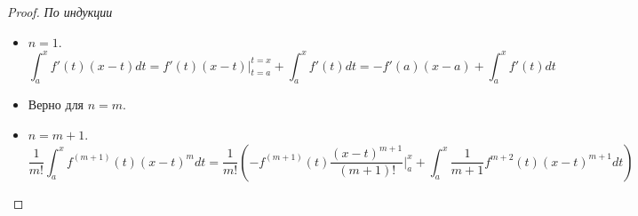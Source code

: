 \begin{proof} \textit{По индукции}
	\begin{itemize}
		\item $n = 1$.
		\[
			\int_a^xf'(t)(x - t)dt = f'(t)(x - t) \Biggr |_{t = a}^{t = x} + \int_a^xf'(t)dt = - f'(a)(x - a) + \int_a^xf'(t)dt
		\]
		\item Верно для $n = m$.
		\item $n = m + 1$.
		\[
			\frac{1}{m!}\int_a^xf^{(m + 1)}(t)(x - t)^mdt = \frac{1}{m!}(-f^{(m + 1)}(t)\frac{(x - t)^{m + 1}}{(m + 1)!}\Biggr |_a^x + \int_a^x\frac{1}{m + 1}f^{m + 2}(t)(x - t)^{m + 1}dt)
		\]
		
	\end{itemize}
	
\end{proof}